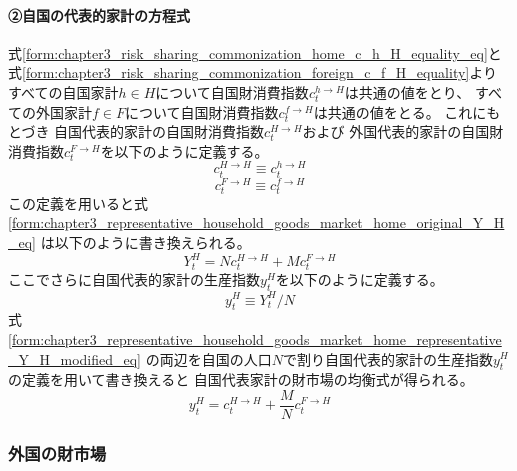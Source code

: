 \paragraph{②自国の代表的家計の方程式}
\label{sec:chapter3_representative_household_goods_market_home_representative}
式\eqref{form:chapter3_risk_sharing_commonization_home_c_h_H_equality_eq}と
式\eqref{form:chapter3_risk_sharing_commonization_foreign_c_f_H_equality}より
すべての自国家計\(h\in H\)について自国財消費指数\(c_t^{h\to H}\)は共通の値をとり、
すべての外国家計\(f\in F\)について自国財消費指数\(c_t^{f\to H}\)は共通の値をとる。
これにもとづき
自国代表的家計の自国財消費指数\(c_t^{H\to H}\)および
外国代表的家計の自国財消費指数\(c_t^{F\to H}\)を以下のように定義する。
\begin{equation}
\label{form:chapter3_representative_household_goods_market_home_representative_c_H_H_def}
    c_t^{H\to H}\equiv c_t^{h\to H}
\end{equation}
\begin{equation}
\label{form:chapter3_representative_household_goods_market_home_representative_c_F_H_def}
    c_t^{F\to H}\equiv c_t^{f\to H}
\end{equation}
この定義を用いると式
\eqref{form:chapter3_representative_household_goods_market_home_original_Y_H_eq}
は以下のように書き換えられる。
\begin{equation}
\label{form:chapter3_representative_household_goods_market_home_representative_Y_H_modified_eq}
    Y_t^H=Nc_t^{H\to H}+Mc_t^{F\to H}
\end{equation}
ここでさらに自国代表的家計の生産指数\(y_t^H\)を以下のように定義する。
\begin{equation}
\label{form:chapter3_representative_household_goods_market_home_representative_y_H_def}
    y_t^H\equiv Y_t^H/N
\end{equation}
式
\eqref{form:chapter3_representative_household_goods_market_home_representative_Y_H_modified_eq}
の両辺を自国の人口\(N\)で割り自国代表的家計の生産指数\(y_t^H\)の定義を用いて書き換えると
自国代表家計の財市場の均衡式が得られる。
\begin{equation}
\label{form:chapter3_representative_household_goods_market_home_representative_y_H_eq}
    y_t^H=c_t^{H\to H}+\frac{M}{N}c_t^{F\to H}
\end{equation}

\subsubsection{外国の財市場}
\label{sec:chapter3_representative_household_goods_market_foreign}

